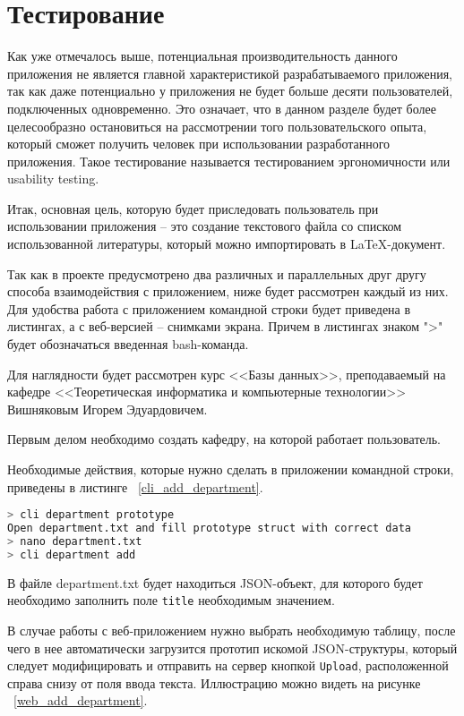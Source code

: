\section*{Тестирование}

Как уже отмечалось выше, потенциальная производительность данного приложения не является главной характеристикой
разрабатываемого приложения, так как даже потенциально у приложения не будет больше десяти пользователей,
подключенных одновременно. Это означает, что в данном разделе будет более целесообразно остановиться на
рассмотрении того пользовательского опыта, который сможет получить человек при использовании разработанного
приложения. Такое тестирование называется тестированием эргономичности или usability testing.

Итак, основная цель, которую будет приследовать пользователь при использовании приложения -- это создание
текстового файла со списком использованной литературы, который можно импортировать в LaTeX-документ.

Так как в проекте предусмотрено два различных и параллельных друг другу способа взаимодействия с приложением,
ниже будет рассмотрен каждый из них. Для удобства работа с приложением командной строки будет приведена
в листингах, а с веб-версией -- снимками экрана. Причем в листингах знаком ">" будет обозначаться введенная
bash-команда.

Для наглядности будет рассмотрен курс <<Базы данных>>, преподаваемый на кафедре <<Теоретическая информатика и компьютерные технологии>>
Вишняковым Игорем Эдуардовичем.

Первым делом необходимо создать кафедру, на которой работает пользователь.

Необходимые действия, которые нужно сделать в приложении командной строки, приведены в листинге ~\ref{cli_add_department}.

\begin{lstlisting}[language=bash, caption = {Добавление кафедры}, captionpos=b, label={cli_add_department}]
> cli department prototype
Open department.txt and fill prototype struct with correct data
> nano department.txt 
> cli department add
\end{lstlisting}

В файле department.txt будет находиться JSON-объект, для которого будет необходимо заполнить поле \texttt{title}
необходимым значением.

В случае работы с веб-приложением нужно выбрать необходимую таблицу, после чего в нее автоматически загрузится прототип
искомой JSON-структуры, который следует модифицировать и отправить на сервер кнопкой \texttt{Upload}, расположенной справа снизу
от поля ввода текста. Иллюстрацию можно видеть на рисунке ~\ref{web_add_department}.

